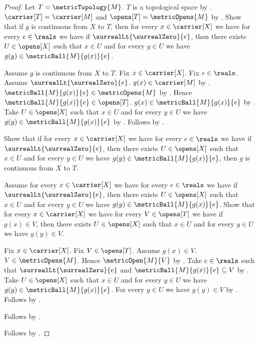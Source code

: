 \begin{proof}
    Let $T=\metricTopology{M}$.
    $T$ is a topological space
        by .
    $\carrier[T]=\carrier[M]$ and $\opens[T]=\metricOpens{M}$
        by .
    Show that if $g$ is continuous from $X$ to $T$, then
        for every $x\in\carrier[X]$ we have
        for every $e\in\reals$ we have if
            $\surrealLt{\surrealZero}{e}$, then there exists
            $U\in\opens[X]$ such that $x\in U$ and
            for every $y\in U$ we have
                $g(y)\in\metricBall{M}{g(x)}{e}$.
    \begin{subproof}
        Assume $g$ is continuous from $X$ to $T$.
        Fix $x\in\carrier[X]$.
        Fix $e\in\reals$.
        Assume $\surrealLt{\surrealZero}{e}$.
        $g(x)\in\carrier[M]$ by .
        $\metricBall{M}{g(x)}{e}\in\metricOpens{M}$
            by .
        Hence $\metricBall{M}{g(x)}{e}\in\opens[T]$.
        $g(x)\in\metricBall{M}{g(x)}{e}$
            by .
        Take $U\in\opens[X]$ such that $x\in U$ and
            for every $y\in U$ we have
                $g(y)\in\metricBall{M}{g(x)}{e}$
            by .
        Follows by \auto.
    \end{subproof}
    Show that if for every $x\in\carrier[X]$ we have
        for every $e\in\reals$ we have if
            $\surrealLt{\surrealZero}{e}$, then there exists
            $U\in\opens[X]$ such that $x\in U$ and
            for every $y\in U$ we have
                $g(y)\in\metricBall{M}{g(x)}{e}$, then
        $g$ is continuous from $X$ to $T$.
    \begin{subproof}
        Assume for every $x\in\carrier[X]$ we have
            for every $e\in\reals$ we have if
                $\surrealLt{\surrealZero}{e}$, then there exists
                $U\in\opens[X]$ such that $x\in U$ and
                for every $y\in U$ we have
                    $g(y)\in\metricBall{M}{g(x)}{e}$.
        Show that for every $x\in\carrier[X]$ we have
            for every $V\in\opens[T]$ we have if $g(x)\in V$, then
            there exists $U\in\opens[X]$ such that $x\in U$ and
                for every $y\in U$ we have $g(y)\in V$.
        \begin{subproof}
            Fix $x\in\carrier[X]$.
            Fix $V\in\opens[T]$.
            Assume $g(x)\in V$.
            $V\in\metricOpens{M}$.
            Hence $\metricOpen{M}{V}$ by .
            Take $e\in\reals$ such that
                $\surrealLt{\surrealZero}{e}$ and
                $\metricBall{M}{g(x)}{e}\subseteq V$
                by .
            Take $U\in\opens[X]$ such that $x\in U$ and
                for every $y\in U$ we have
                    $g(y)\in\metricBall{M}{g(x)}{e}$.
            For every $y\in U$ we have $g(y)\in V$
                by .
            Follows by \auto.
        \end{subproof}
        Follows by .
    \end{subproof}
    Follows by \auto.
\end{proof}
